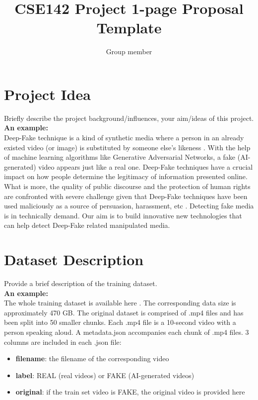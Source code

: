 \documentclass[runningheads]{llncs}
\title{CSE142 Project 1-page Proposal Template}
\author{Group member}
\begin{document}
\maketitle
\section{Project Idea}
Briefly describe the project background/influences, your aim/ideas of this project.   \\
\textbf{An example:}\\
Deep-Fake technique is a kind of synthetic media where a person in an already existed video (or image) is substituted by someone else's likeness \cite{wiki}. With the help of machine learning algorithms like Generative Adversarial Networks, a fake (AI-generated) video appears just like a real one. Deep-Fake techniques have a crucial impact on how people determine the legitimacy of information presented online. What is more, the quality of public discourse and the protection of human rights are confronted with severe challenge given that Deep-Fake techniques have been used maliciously as a source of persuasion, harassment, etc  \cite{kaggle}. Detecting fake media is in technically demand. Our aim is to build innovative new technologies that can help detect Deep-Fake related manipulated media.


\section{Dataset Description}
Provide a brief description of the training dataset.\\
\textbf{An example:}\\
The whole training dataset is available here \cite{Data}. The corresponding data size is approximately 470 GB. The original dataset is comprised of .mp4 files and has been split into 50 smaller chunks. Each .mp4 file is a 10-second video with a person speaking aloud. A metadata.json accompanies each chunk of .mp4 files. 3 columns are included in each .json file:
\begin{itemize}
  \item \textbf{filename}: the filename of the corresponding video
  \item \textbf{label}: REAL (real videos) or FAKE (AI-generated videos)
  \item  \textbf{original}: if the train set video is FAKE, the original video is provided here
\end{itemize}
\end{document}
